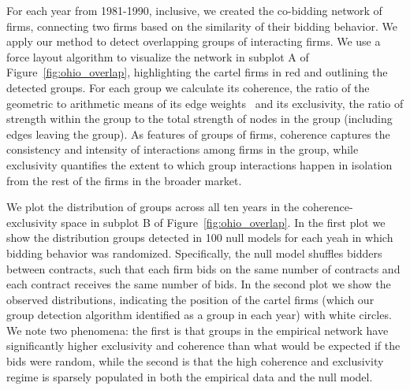 For each year from 1981-1990, inclusive, we created the co-bidding network of firms, connecting two firms based on the similarity of their bidding behavior. We apply our method to detect overlapping groups of interacting firms. We use a force layout algorithm to visualize the network in subplot A of Figure~\ref{fig:ohio_overlap}, highlighting the cartel firms in red and outlining the detected groups.  For each group we calculate its coherence, the ratio of the geometric to arithmetic means of its edge weights~\cite{onnela2005intensity} and its exclusivity, the ratio of strength within the group to the total strength of nodes in the group (including edges leaving the group). As features of groups of firms, coherence captures the consistency and intensity of interactions among firms in the group, while exclusivity quantifies the extent to which group interactions happen in isolation from the rest of the firms in the broader market.

We plot the distribution of groups across all ten years in the coherence-exclusivity space in subplot B of Figure~\ref{fig:ohio_overlap}. In the first plot we show the distribution groups detected in 100 null models for each yeah in which bidding behavior was randomized. Specifically, the null model shuffles bidders between contracts, such that each firm bids on the same number of contracts and each contract receives the same number of bids. In the second plot we show the observed distributions, indicating the position of the cartel firms (which our group detection algorithm identified as a group in each year) with white circles. We note two phenomena: the first is that groups in the empirical network have significantly higher exclusivity and coherence than what would be expected if the bids were random, while the second is that the high coherence and exclusivity regime is sparsely populated in both the empirical data and the null model.

